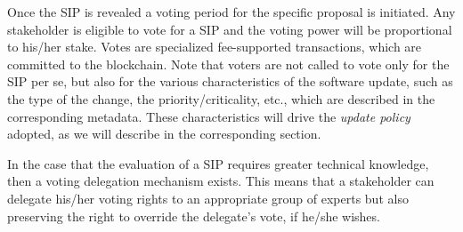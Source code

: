 Once the SIP is revealed a voting period for the specific proposal is initiated. Any stakeholder is eligible to vote for a SIP and the voting power will be proportional to his/her stake. Votes are specialized fee-supported transactions, which are committed to the blockchain. Note that voters are not called to vote only for the SIP per se, but also for the various characteristics of the software update, such as the type of the change, the priority/criticality, etc., which are described in the corresponding metadata. These characteristics will drive the \emph{update policy} adopted, as we will describe in the corresponding section.

In the case that the evaluation of a SIP requires greater technical knowledge, then a voting delegation mechanism exists. This means that a stakeholder can delegate his/her voting rights to an appropriate group of experts but also preserving the right to override the delegate's vote, if he/she wishes. 



